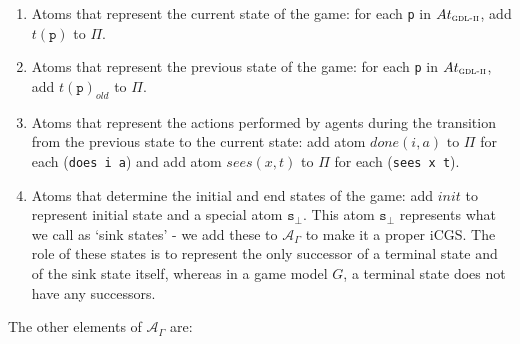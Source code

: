 \documentclass{article}
\theoremstyle{theorem}
\theoremstyle{lemma}
\theoremstyle{definition}
\theoremstyle{remark}
\begin{document}
\begin{enumerate}
    \item Atoms that represent the current state of the game: for each \texttt{p} in $At_\textsc{gdl-ii}$, add $t(\texttt{p})$ to $\Pi$.
    \item Atoms that represent the previous state of the game: for each \texttt{p} in $At_\textsc{gdl-ii}$, add $t(\texttt{p})_{old}$ to $\Pi$.
    \item Atoms that represent the actions performed by agents during the transition from the previous state to the current state: add atom $done(i,a)\text{ to } \Pi$ for each (\texttt{does i a}) and add atom $sees(x,t)$ to $\Pi$ for each (\texttt{sees x t}).
    \item Atoms that determine the initial and end states of the game: add $init$ to represent initial state and a special atom $\texttt{s}_\bot$. This atom $\texttt{s}_\bot$ represents what we call as `sink states' - we add these to $\mathcal{A}_\Gamma$ to make it a proper iCGS. The role of these states is to represent the only successor of a terminal state and of the sink state itself, whereas in a game model $G$, a terminal state does not have any successors.
\end{enumerate}
\par The other elements of $\mathcal{A}_\Gamma$ are:
\end{document}
